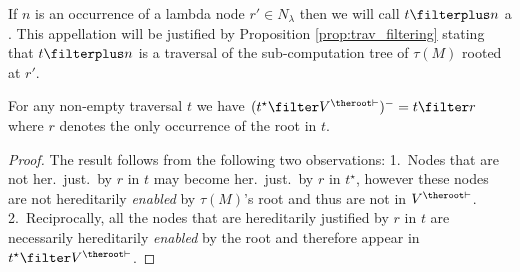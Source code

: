 If $n$ is an occurrence of a lambda node $r' \in N_\lambda$ then we
will call $t \filterplus n$ a . This appellation will be justified by
Proposition \ref{prop:trav_filtering} stating that $t \filterplus n$
is a traversal of the sub-computation tree of $\tau(M)$ rooted at
$r'$.
\bigskip


\begin{lemma}
\label{lem:he_filter_root_is_hj_filter_r}
For any non-empty traversal $t$ we have  $(t^\star\filter V^{\theroot\vdash})^- = t \filter r$
where $r$ denotes the only occurrence of the root in $t$.
\end{lemma}
\begin{proof}
The result follows from the following two observations:
1.\ Nodes that are not her.\ just.\ by $r$ in $t$ may become
her.\ just.\ by $r$ in $t^\star$, however these nodes are not hereditarily \emph{enabled}
 by $\tau(M)$'s root and thus are not in $V^{\theroot\vdash}$.
2.\ Reciprocally, all the nodes that are hereditarily justified by $r$ in $t$ are necessarily
hereditarily \emph{enabled} by the root and therefore appear in $t^\star \filter V^{\theroot\vdash}$.
\end{proof}


